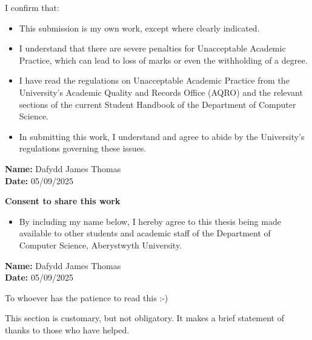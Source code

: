 \begin{singlespace}

   I confirm that:\\
   \begin{itemize}
  \item This submission is my own work, except where clearly indicated.
  \item I understand that there are severe penalties for Unacceptable Academic Practice, which can lead to loss of marks or even the withholding of a degree.
  \item I have read the regulations on Unacceptable Academic Practice from the University’s Academic Quality and Records Office (AQRO) and the relevant    sections of the current Student Handbook of the Department of Computer Science.
  \item In submitting this work, I understand and agree to abide by the University’s regulations governing these issues.
 \end{itemize}
 \vspace{10pt}
 \textbf{Name:} Dafydd James Thomas\\
 \textbf{Date:} 05/09/2025
 \vspace{50pt}
 
 \begin{center}
    \textbf{Consent to share this work}
\end{center}
\begin{itemize}
    \item By including my name below, I hereby agree to this thesis being made available to other students and academic staff of the Department of Computer Science, Aberystwyth University.
\end{itemize}

\vspace{10pt}
\textbf{Name:} Dafydd James Thomas\\
\textbf{Date:} 05/09/2025






    \null\vskip1.5in
    \begin{center}

    To whoever has the patience to read this :-)
    
    This section is customary, but not obligatory.  It makes a brief statement of thanks to those who have helped.

    \end{center}

  \afterpreface

  \end{singlespace}